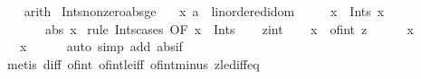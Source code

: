 \begin{isabellebody}
%
\isadelimproof
\ \ %
\endisadelimproof
%
\isatagproof
{}\isamarkupfalse%
\ arith%
\endisatagproof
{\isafoldproof}%
%
\isadelimproof
\isanewline
%
\endisadelimproof
\isanewline
{}\isamarkupfalse%
\ Ints{\isacharunderscore}{\kern0pt}nonzero{\isacharunderscore}{\kern0pt}abs{\isacharunderscore}{\kern0pt}ge{}{\isacharcolon}{\kern0pt}\isanewline
\ \ \ x{\isacharcolon}{\kern0pt}{\isacharcolon}{\kern0pt}\ {\isachardoublequoteopen}{\isacharprime}{\kern0pt}a\ {\isacharcolon}{\kern0pt}{\isacharcolon}{\kern0pt}\ linordered{\isacharunderscore}{\kern0pt}idom{\isachardoublequoteclose}\isanewline
\ \ \ \ \ {\isachardoublequoteopen}x\ {\isasymin}\ Ints{\isachardoublequoteclose}\ {\isachardoublequoteopen}x\ {\isasymnoteq}\ {}{\isachardoublequoteclose}\isanewline
\ \ \ \ \ {\isachardoublequoteopen}{}\ {\isasymle}\ abs\ x{\isachardoublequoteclose}\isanewline
%
\isadelimproof
%
\endisadelimproof
%
\isatagproof
{}\isamarkupfalse%
\ {\isacharparenleft}{\kern0pt}rule\ Ints{\isacharunderscore}{\kern0pt}cases\ {\isacharbrackleft}{\kern0pt}OF\ {\isacartoucheopen}x\ {\isasymin}\ Ints{\isacartoucheclose}{\isacharbrackright}{\kern0pt}{\isacharparenright}{\kern0pt}\isanewline
\ \ \isamarkupfalse%
\ z{\isacharcolon}{\kern0pt}{\isacharcolon}{\kern0pt}int\isanewline
\ \ \isamarkupfalse%
\ {\isachardoublequoteopen}x\ {\isacharequal}{\kern0pt}\ of{\isacharunderscore}{\kern0pt}int\ z{\isachardoublequoteclose}\isanewline
\ \ \ \ \isamarkupfalse%
\ {\isacartoucheopen}x\ {\isasymnoteq}\ {}{\isacartoucheclose}\ \isanewline
\ \ \isamarkupfalse%
\ {\isachardoublequoteopen}{}\ {\isasymle}\ {\isasymbar}x{\isasymbar}{\isachardoublequoteclose}\isanewline
\ \ \ \ \isamarkupfalse%
\ {\isacharparenleft}{\kern0pt}auto\ simp\ add{\isacharcolon}{\kern0pt}\ abs{\isacharunderscore}{\kern0pt}if{\isacharparenright}{\kern0pt}\isanewline
\ \ \ \ \isamarkupfalse%
\ {\isacharparenleft}{\kern0pt}metis\ diff{\isacharunderscore}{\kern0pt}{}\ of{\isacharunderscore}{\kern0pt}int{\isacharunderscore}{\kern0pt}{}\ of{\isacharunderscore}{\kern0pt}int{\isacharunderscore}{\kern0pt}le{\isacharunderscore}{\kern0pt}iff\ of{\isacharunderscore}{\kern0pt}int{\isacharunderscore}{\kern0pt}minus\ zle{\isacharunderscore}{\kern0pt}diff{}{\isacharunderscore}{\kern0pt}eq{\isacharparenright}{\kern0pt}\isanewline
{}\isamarkupfalse%

\end{isabellebody}
